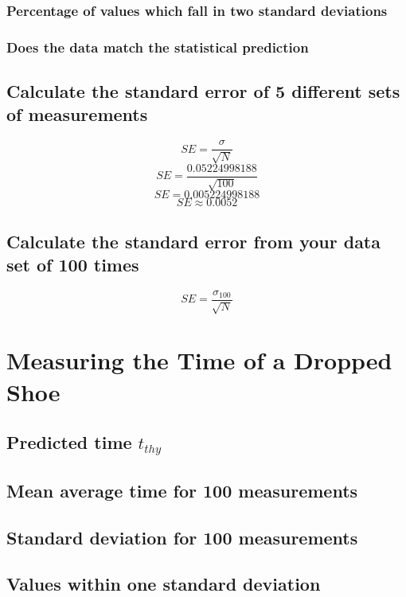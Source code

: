\documentclass[11pt, letterpaper, includehead]{article}
\begin{document}
\subsubsection{Percentage of values which fall in two standard deviations}

\subsubsection{Does the data match the statistical prediction}

\subsection{Calculate the standard error of 5 different sets of measurements}


$$SE = \frac{\sigma}{\sqrt{N}}$$
$$SE = \frac{0.05224998188}{\sqrt{100}}$$
$$SE = 0.005224998188$$
$$SE \approx 0.0052$$

\subsection{Calculate the standard error from your data set of 100 times}

$$SE = \frac{\sigma_{100}}{\sqrt{N}}$$

\section{Measuring the Time of a Dropped Shoe}

\subsection{Predicted time $t_{thy}$} %

\setcounter{subsection}{3} %
\subsection{Mean average time for 100 measurements} %

\subsection{Standard deviation for 100 measurements} %

\subsection{Values within one standard deviation} %
\end{document}
